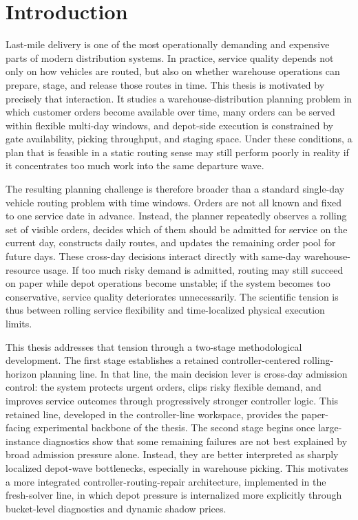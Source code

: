 \chapter{Introduction}
\label{ch:introduction}

Last-mile delivery is one of the most operationally demanding and expensive parts of modern distribution systems. In practice, service quality depends not only on how vehicles are routed, but also on whether warehouse operations can prepare, stage, and release those routes in time. This thesis is motivated by precisely that interaction. It studies a warehouse-distribution planning problem in which customer orders become available over time, many orders can be served within flexible multi-day windows, and depot-side execution is constrained by gate availability, picking throughput, and staging space. Under these conditions, a plan that is feasible in a static routing sense may still perform poorly in reality if it concentrates too much work into the same departure wave.

The resulting planning challenge is therefore broader than a standard single-day vehicle routing problem with time windows. Orders are not all known and fixed to one service date in advance. Instead, the planner repeatedly observes a rolling set of visible orders, decides which of them should be admitted for service on the current day, constructs daily routes, and updates the remaining order pool for future days. These cross-day decisions interact directly with same-day warehouse-resource usage. If too much risky demand is admitted, routing may still succeed on paper while depot operations become unstable; if the system becomes too conservative, service quality deteriorates unnecessarily. The scientific tension is thus between rolling service flexibility and time-localized physical execution limits.

This thesis addresses that tension through a two-stage methodological development. The first stage establishes a retained controller-centered rolling-horizon planning line. In that line, the main decision lever is cross-day admission control: the system protects urgent orders, clips risky flexible demand, and improves service outcomes through progressively stronger controller logic. This retained line, developed in the controller-line workspace, provides the paper-facing experimental backbone of the thesis. The second stage begins once large-instance diagnostics show that some remaining failures are not best explained by broad admission pressure alone. Instead, they are better interpreted as sharply localized depot-wave bottlenecks, especially in warehouse picking. This motivates a more integrated controller-routing-repair architecture, implemented in the fresh-solver line, in which depot pressure is internalized more explicitly through bucket-level diagnostics and dynamic shadow prices.

